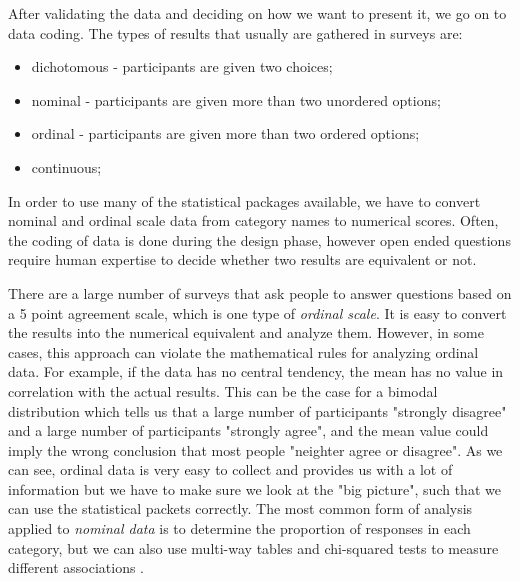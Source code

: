 \documentclass{report}
\begin{document}
After validating the data and deciding on how we want to present it, we go on to data coding. The types of results that usually are gathered in surveys are:
\begin{itemize}
\item dichotomous - participants are given two choices;\\
\item nominal - participants are given more than two unordered options;\\
\item ordinal - participants are given more than two ordered options;\\
\item continuous;
\end{itemize} 
In order to use many of the statistical packages available, we have to convert nominal and ordinal scale data from category names to numerical scores. Often, the coding of data is done during the design phase, however open ended questions require human expertise to decide whether two results are equivalent or not. 

There are a large number of surveys that ask people to answer questions based on a 5 point agreement scale, which is one type of \textit{ordinal scale}. It is easy to convert the results into the numerical equivalent and analyze them. However, in some cases, this approach can violate the mathematical rules for analyzing ordinal data. For example, if the data has no central tendency, the mean has no value in correlation with the actual results. This can be the case for a bimodal distribution which tells us that a large number of participants "strongly disagree" and a large number of participants "strongly agree", and the mean value could imply the wrong conclusion that most people "neighter agree or disagree". As we can see, ordinal data is very easy to collect and provides us with a lot of information but we have to make sure we look at the "big picture", such that we can use the statistical packets correctly. The most common form of analysis applied to \textit{nominal data} is to determine the proportion of responses in each category, but we can also use multi-way tables and chi-squared tests to measure different associations \cite{Kitchenham6}.
\end{document}
